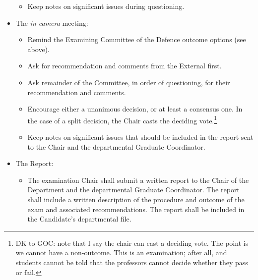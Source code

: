 \documentclass[12pt]{article}
\newcommand{\discuss}[1]{\footnote{\color{fixmeColor}#1\color{black}}\index{$>>>>$DISCUSS$<<<<$}}
\newcommand{\GC}{Graduate Coordinator\xspace}
\begin{document}
\begin{itemize}
\begin{itemize}
            \item Keep notes on significant issues during questioning.

        \end{itemize}

    \item The \emph{in camera} meeting:

        \begin{itemize}

            \item Remind the Examining Committee of the Defence outcome options
                (see above).

            \item Ask for recommendation and comments from the External first.

            \item Ask remainder of the Committee, in order of questioning, for
                their recommendation and comments.

            \item Encourage either a unanimous decision, or at least a
                consensus one. In the case of a split decision, the Chair casts
                the deciding vote.\discuss{DK to GOC: note that I say the chair
                can cast a deciding vote. The point is we cannot have a
                non-outcome. This is an examination; after all, and students
                cannot be told that the professors cannot decide whether they
                pass or fail.}

            \item Keep notes on significant issues that should be included in
                the report sent to the Chair and the departmental \GC.

        \end{itemize}

    \item The Report:

        \begin{itemize}


            \item The examination Chair shall submit a written report to the
                Chair of the Department and the departmental \GC.  The report
                shall include a written description of the procedure and
                outcome of the exam and associated recommendations. The report
                shall be included in the Candidate’s departmental file.

        \end{itemize}

\end{itemize}
\end{document}
